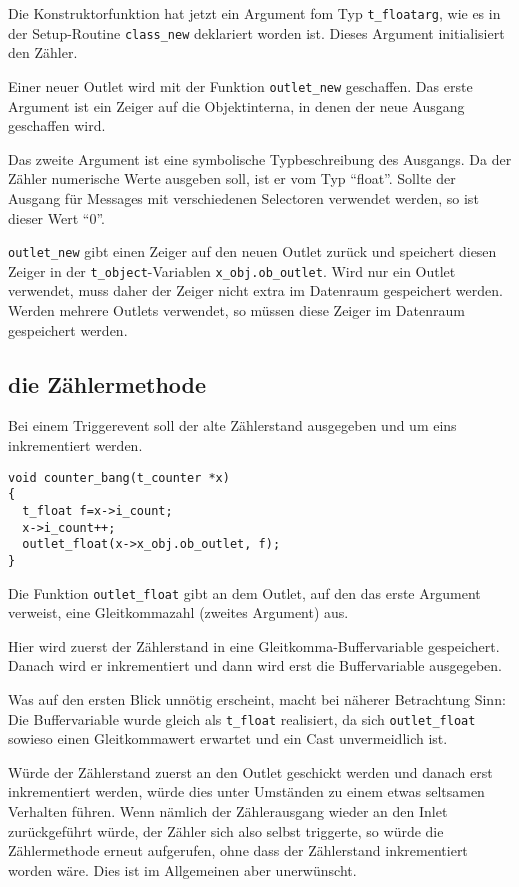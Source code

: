 \documentclass[12pt, a4paper,austrian, titlepage]{article}
\begin{document}
Die Konstruktorfunktion hat jetzt ein Argument fom Typ \verb+t_floatarg+, wie es in
der Setup-Routine \verb+class_new+ deklariert worden ist.
Dieses Argument initialisiert den Zähler.

Einer neuer Outlet wird mit der Funktion \verb+outlet_new+ geschaffen.
Das erste Argument ist ein Zeiger auf die Objektinterna,
in denen der neue Ausgang geschaffen wird.

Das zweite Argument ist eine symbolische Typbeschreibung des Ausgangs.
Da der Zähler numerische Werte ausgeben soll, ist er vom Typ ``float''.
Sollte der Ausgang für Messages mit verschiedenen Selectoren verwendet werden,
so ist dieser Wert ``0''.

\verb+outlet_new+ gibt einen Zeiger auf den neuen Outlet zurück und speichert diesen
Zeiger in der \verb+t_object+-Variablen \verb+x_obj.ob_outlet+.
Wird nur ein Outlet verwendet, muss daher der Zeiger nicht extra im Datenraum gespeichert
werden.
Werden mehrere Outlets verwendet, so müssen diese Zeiger im Datenraum gespeichert werden.

\subsection{die Zählermethode}
Bei einem Triggerevent soll der alte Zählerstand ausgegeben und um eins inkrementiert werden.

\begin{verbatim}
void counter_bang(t_counter *x)
{
  t_float f=x->i_count;
  x->i_count++;
  outlet_float(x->x_obj.ob_outlet, f);
}
\end{verbatim}

Die Funktion \verb+outlet_float+ gibt an dem Outlet, auf den das erste Argument verweist,
eine Gleitkommazahl (zweites Argument) aus.

Hier wird zuerst der Zählerstand in eine Gleitkomma-Buffervariable gespeichert.
Danach wird er inkrementiert und dann wird erst die Buffervariable ausgegeben.

Was auf den ersten Blick unnötig erscheint, macht bei näherer Betrachtung Sinn:
Die Buffervariable wurde gleich als \verb+t_float+ realisiert,
da sich \verb+outlet_float+ sowieso einen Gleitkommawert erwartet
und ein Cast unvermeidlich ist.

Würde der Zählerstand zuerst an den Outlet geschickt werden und
danach erst inkrementiert werden, würde dies unter Umständen zu einem etwas seltsamen
Verhalten führen.
Wenn nämlich der Zählerausgang wieder an den Inlet zurückgeführt würde, der
Zähler sich also selbst triggerte, so würde die Zählermethode erneut
aufgerufen, ohne dass der Zählerstand inkrementiert worden wäre.
Dies ist im Allgemeinen aber unerwünscht.
\end{document}

